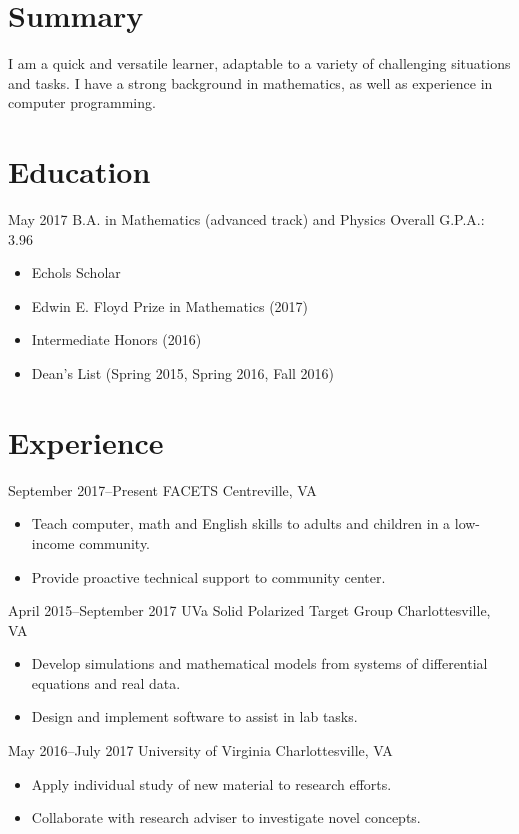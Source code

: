 \documentclass[10pt]{article}
\begin{document}


\section*{Summary}
I am a quick and versatile learner, adaptable to a variety of
challenging situations and tasks. I have a strong background in
mathematics, as well as experience in computer programming.

\section*{Education}
{May 2017}
{B.A. in Mathematics (advanced track) and Physics}
{Overall G.P.A.: 3.96}
\begin{itemize}
\item Echols Scholar
\item Edwin E. Floyd Prize in Mathematics (2017)
\item Intermediate Honors (2016)
\item Dean's List (Spring 2015, Spring 2016, Fall 2016)
\end{itemize}

\section*{Experience}
{September 2017--Present}
{FACETS}
{Centreville, VA}
\begin{itemize}
\item Teach computer, math and English skills to adults and children in a
  low-income community.
\item Provide proactive technical support to community center.
\end{itemize}

{April 2015--September 2017}
{UVa Solid Polarized Target Group}
{Charlottesville, VA}
\begin{itemize}
\item Develop simulations and mathematical models from systems of differential
  equations and real data.
\item Design and implement software to assist in lab tasks.
\end{itemize}

{May 2016--July 2017}
{University of Virginia}
{Charlottesville, VA}
\begin{itemize}
\item Apply individual study of new material to research efforts.
\item Collaborate with research adviser to investigate novel concepts.
\end{itemize}
\end{document}
